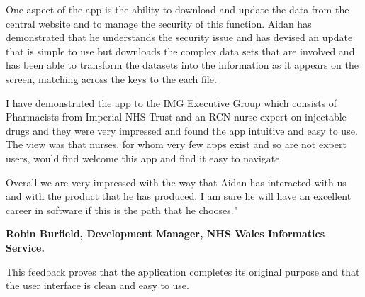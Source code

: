 \begin{itshape}
One aspect of the app is the ability to download and update the data from the central website and to manage the security of this function. Aidan has demonstrated that he understands the security issue and has devised an update that is simple to use but downloads the complex data sets that are involved and has been able to transform the datasets into the information as it appears on the screen, matching across the keys to the each file.

I have demonstrated the app to the IMG Executive Group which consists of Pharmacists from Imperial NHS Trust and an RCN nurse expert on injectable drugs and they were very impressed and found the app intuitive and easy to use. The view was that nurses, for whom very few apps exist and so are not expert users, would find welcome this app and find it easy to navigate.

Overall we are very impressed with the way that Aidan has interacted with us and with the product that he has produced. I am sure he will have an excellent career in software if this is the path that he chooses."
\end{itshape}

\textbf{Robin Burfield, Development Manager, NHS Wales Informatics Service.}

This feedback proves that the application completes its original purpose and that the user interface is clean and easy to use.

